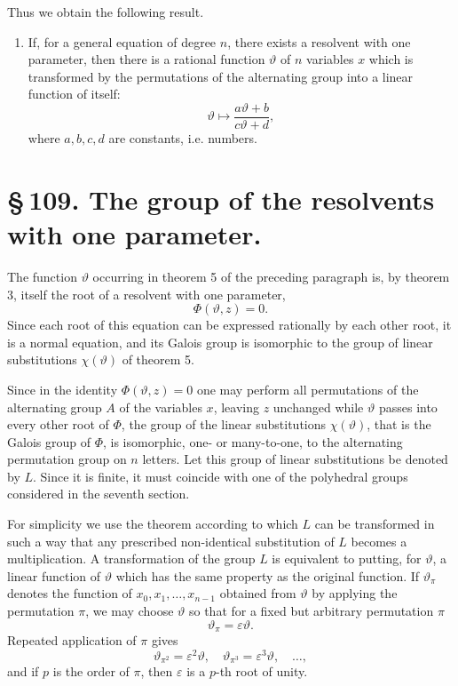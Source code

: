 \documentclass[11pt]{article}
\begin{document}
Thus we obtain the following result.

\begin{enumerate}[label=\arabic*.,start=5]
\item If, for a general equation of degree \(n\), there exists a resolvent with one parameter, then there is a rational function \(\vartheta\) of \(n\) variables \(x\) which is transformed by the permutations of the alternating group into a linear function of itself:
\[
\vartheta\longmapsto\frac{a\vartheta+b}{c\vartheta+d},
\]
where \(a,b,c,d\) are constants, i.e. numbers.
\end{enumerate}

\section*{\S\,109. The group of the resolvents with one parameter.}

The function \(\vartheta\) occurring in theorem 5 of the preceding paragraph is, by theorem 3, itself the root of a resolvent with one parameter,
\[
\Phi(\vartheta,z)=0.
\]
Since each root of this equation can be expressed rationally by each other root, it is a normal equation, and its Galois group is isomorphic to the group of linear substitutions \(\chi(\vartheta)\) of theorem 5.

Since in the identity \(\Phi(\vartheta,z)=0\) one may perform all permutations of the alternating group \(A\) of the variables \(x\), leaving \(z\) unchanged while \(\vartheta\) passes into every other root of \(\Phi\), the group of the linear substitutions \(\chi(\vartheta)\), that is the Galois group of \(\Phi\), is isomorphic, one- or many-to-one, to the alternating permutation group on \(n\) letters. Let this group of linear substitutions be denoted by \(L\). Since it is finite, it must coincide with one of the polyhedral groups considered in the seventh section.

For simplicity we use the theorem according to which \(L\) can be transformed in such a way that any prescribed non-identical substitution of \(L\) becomes a multiplication. A transformation of the group \(L\) is equivalent to putting, for \(\vartheta\), a linear function of \(\vartheta\) which has the same property as the original function. If \(\vartheta_\pi\) denotes the function of \(x_0,x_1,\ldots,x_{n-1}\) obtained from \(\vartheta\) by applying the permutation \(\pi\), we may choose \(\vartheta\) so that for a fixed but arbitrary permutation \(\pi\)
\[
\vartheta_\pi=\varepsilon\vartheta.
\]
Repeated application of \(\pi\) gives
\[
\vartheta_{\pi^2}=\varepsilon^2\vartheta,\quad
\vartheta_{\pi^3}=\varepsilon^3\vartheta,\quad\ldots,
\]
and if \(p\) is the order of \(\pi\), then \(\varepsilon\) is a \(p\)-th root of unity.
\end{document}
